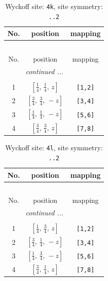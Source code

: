 \documentclass[fleqn,8pt]{jsarticle}
\begin{document}
\renewcommand{\arraystretch}{1.2}
\begin{longtable}{ccc}
\caption{Wyckoff site: {\tt 4k}, site symmetry: {\tt ..2}}
 \\
 \hline \hline
No. & position & mapping \\ \hline \endfirsthead

\multicolumn{2}{l}{\tablename\ \thetable{}} \\
 \hline \hline
No. & position & mapping \\ \hline \endhead

 \hline \hline
\multicolumn{2}{r}{\footnotesize\it continued ...} \\ \endfoot

 \hline \hline
\multicolumn{2}{r}{} \\ \endlastfoot

1 & $\left[ \frac{1}{4},\, \frac{1}{4},\, z \right]$ & {\tt [1,2]} \\ \hline
2 & $\left[ \frac{3}{4},\, \frac{3}{4},\, - z \right]$ & {\tt [3,4]} \\ \hline
3 & $\left[ \frac{1}{4},\, \frac{1}{4},\, - z \right]$ & {\tt [5,6]} \\ \hline
4 & $\left[ \frac{3}{4},\, \frac{3}{4},\, z \right]$ & {\tt [7,8]} \\
\end{longtable}
\renewcommand{\arraystretch}{1.2}
\begin{longtable}{ccc}
\caption{Wyckoff site: {\tt 4l}, site symmetry: {\tt ..2}}
 \\
 \hline \hline
No. & position & mapping \\ \hline \endfirsthead

\multicolumn{2}{l}{\tablename\ \thetable{}} \\
 \hline \hline
No. & position & mapping \\ \hline \endhead

 \hline \hline
\multicolumn{2}{r}{\footnotesize\it continued ...} \\ \endfoot

 \hline \hline
\multicolumn{2}{r}{} \\ \endlastfoot

1 & $\left[ \frac{1}{4},\, \frac{3}{4},\, z \right]$ & {\tt [1,2]} \\ \hline
2 & $\left[ \frac{3}{4},\, \frac{1}{4},\, - z \right]$ & {\tt [3,4]} \\ \hline
3 & $\left[ \frac{1}{4},\, \frac{3}{4},\, - z \right]$ & {\tt [5,6]} \\ \hline
4 & $\left[ \frac{3}{4},\, \frac{1}{4},\, z \right]$ & {\tt [7,8]} \\
\end{longtable}
\end{document}
